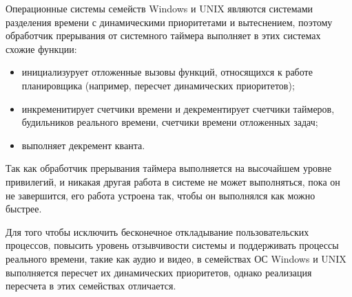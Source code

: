 \documentclass[a4paper,oneside,14pt]{extarticle}
\begin{document}


Операционные системы семейств Windows и UNIX являются системами разделения времени с динамическими приоритетами и вытеснением, поэтому обработчик прерывания от системного таймера выполняет в этих системах схожие функции: 
\begin{itemize}
	\item инициализурует отложенные вызовы функций, относящихся к работе планировщика (например, пересчет динамических приоритетов);
	\item инкременитирует счетчики времени и декрементирует счетчики таймеров, будильников реального времени, счетчики времени отложенных задач;
	\item выполняет декремент кванта.
\end{itemize}

Так как обработчик прерывания таймера выполняется на высочайшем уровне привилегий, и никакая другая работа в системе не может выполняться, пока он не завершится, его работа устроена так, чтобы он выполнялся как можно быстрее. 

Для того чтобы исключить бесконечное откладывание пользовательских процессов, повысить уровень отзывчивости системы и поддерживать процессы реального времени, такие как аудио и видео, в семействах ОС Windows и UNIX выполняется пересчет их динамических приоритетов, однако реализация пересчета в этих семействах отличается. 

\newpage

\renewcommand\refname{СПИСОК ИСПОЛЬЗОВАННЫХ ИСТОЧНИКОВ}
\begingroup

\raggedright

\endgroup
\end{document}
